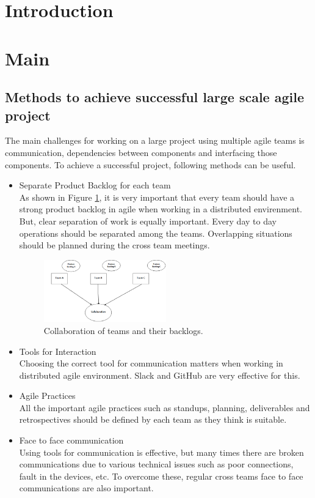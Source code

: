 \documentclass[sigconf]{acmart}
\begin{document}
\section{Introduction}


\section{Main}
\subsection{Methods to achieve successful large scale agile project}
The main challenges for working on a large project using multiple agile teams is communication, dependencies between components and interfacing those components. To achieve a successful project, following methods can be useful. 


\begin{itemize}
\item Separate Product Backlog for each team
\\As shown in Figure \ref{fig:PBCollab}, it is very important that every team should have a strong product backlog in agile when working in a distributed envirenment. But, clear separation of work is equally important. Every day to day operations should be separated among the teams. Overlapping situations should be planned during the cross team meetings.

\begin{figure}[H]
  \includegraphics[width=0.5\textwidth]{PBCollab}
  \caption{Collaboration of teams and their backlogs.}
  \label{fig:PBCollab}
\end{figure}

\item Tools for Interaction
\\Choosing the correct tool for communication matters when working in distributed agile environment. Slack and GitHub are very effective for this.

\item Agile Practices
\\All the important agile practices such as standups, planning, deliverables and retrospectives should be defined by each team as they think is suitable.

\item Face to face communication 
\\Using tools for communication is effective, but many times there are broken communications due to various technical issues such as poor connections, fault in the devices, etc. To overcome these, regular cross teams face to face communications are also important.
\end{itemize}
\end{document}
